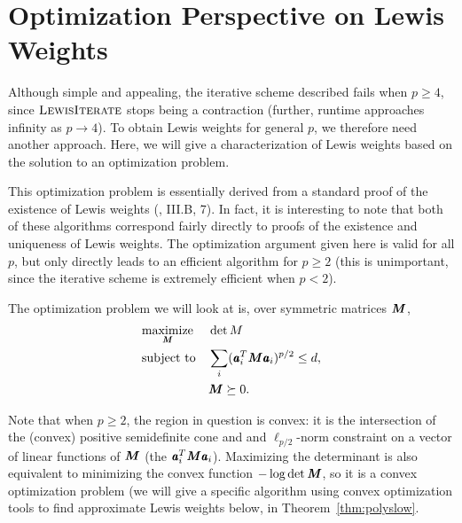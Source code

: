 \section{Optimization Perspective on Lewis Weights}
\label{sec:convex}

Although simple and appealing, the iterative scheme described fails
when $p \geq 4$, since $\textsc{LewisIterate}$ stops being a contraction (further,
runtime approaches infinity as $p \to 4$).  To obtain Lewis weights for general
$p$, we therefore need another approach.  Here, we will give a characterization of
Lewis weights based on the solution to an optimization problem.

This optimization problem is essentially derived from a standard
proof of the existence of Lewis weights (\cite{BanachBook}, III.B, 7).  In fact,
it is interesting to note that both of these algorithms correspond fairly
directly to proofs of the existence and uniqueness of Lewis weights.
The optimization argument given here is valid for
all $p$, but only directly leads to an efficient algorithm for $p \geq 2$
(this is unimportant, since the iterative scheme is extremely efficient
when $p < 2$).

The optimization problem we will look at is, over symmetric matrices $\boldsymbol{\mathit{M}}$,
\begin{equation*}
\begin{aligned}
& \underset{\boldsymbol{\mathit{M}}}{\text{maximize}} & & \det M \\
& \text{subject to}
& & \sum_i (\pmb{\mathit{a}}_i^T \boldsymbol{\mathit{M}} \pmb{\mathit{a}}_i)^{p/2} \leq d, \\
&&& \boldsymbol{\mathit{M}} \succeq 0.
\end{aligned}
\end{equation*}

Note that when $p \geq 2$, the region in question is convex: it is the intersection
of the (convex) positive semidefinite cone and and $\ell_{p/2}$-norm constraint on
a vector of linear functions of $\boldsymbol{\mathit{M}}$ (the $\pmb{\mathit{a}}_i^T \boldsymbol{\mathit{M}} \pmb{\mathit{a}}_i$).  Maximizing the
determinant is also equivalent to minimizing the convex function $-\log \det \boldsymbol{\mathit{M}}$,
so it is a convex optimization problem (we will give a specific algorithm using
convex optimization tools to find approximate Lewis weights below, in Theorem~\ref{thm:polyslow}.

